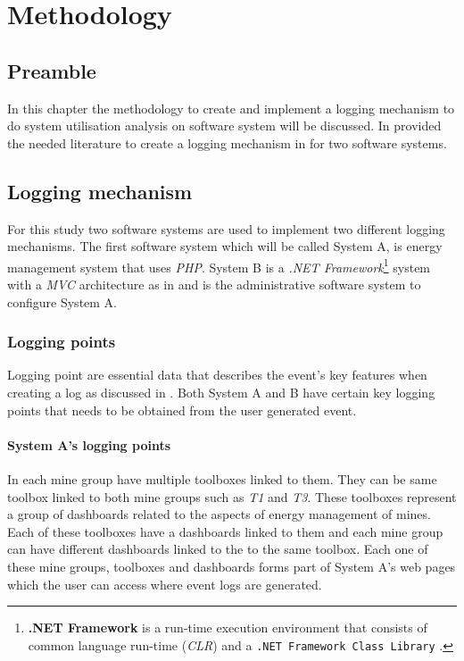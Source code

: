 \chapter{Methodology}
\label{chap:2}

\section{Preamble}
In this chapter the methodology to create and implement a logging mechanism to do system utilisation analysis on software system will be discussed. In  provided the needed literature to create a logging mechanism in  for two software systems.

\section{Logging mechanism}\label{sec:Ch3_LoggingMechanism}
For this study two software systems are used to implement two different logging mechanisms. The first software system which will be called System A, is energy management system that uses \emph{PHP}. System B is a \emph{.NET Framework}\footnote{\label{ftn:NetFramework}\textbf{.NET Framework} is a run-time execution environment that consists of common language run-time (\emph{CLR}) and a \texttt{.NET Framework Class Library} \cite{Harkness2007}.} system with a \emph{MVC} architecture as in  and is the administrative software system to configure System A.

\subsection{Logging points}
Logging point are essential data that describes the event's key features when creating a log as discussed in . Both System A and B have certain key logging points that needs to be obtained from the user generated event.

\subsubsection{System A's logging points}\label{sec:SystemA_LoggingPoints}
In  each mine group have multiple toolboxes linked to them. They can be same toolbox linked to both mine groups such as \emph{T1} and \emph{T3}. These toolboxes represent a group of dashboards related to the aspects of energy management of mines. Each of these toolboxes have a dashboards linked to them and each mine group can have different dashboards linked to the to the same toolbox. Each one of these mine groups, toolboxes and dashboards forms part of System A's web pages which the user can access where event logs are generated.

